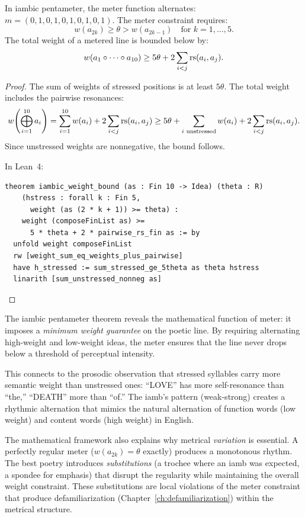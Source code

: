 \begin{theorem}
\label{thm:iambic}
In iambic pentameter, the meter function alternates:
$m = (0, 1, 0, 1, 0, 1, 0, 1, 0, 1)$.  The meter constraint requires:
\[
  w(a_{2k}) \geq \theta > w(a_{2k-1})
  \quad \text{for } k = 1, \ldots, 5.
\]
The total weight of a metered line is bounded below by:
\[
  w(a_1 \circ \cdots \circ a_{10}) \geq 5\theta
  + 2\sum_{i < j} \mathrm{rs}(a_i, a_j).
\]
\end{theorem}

\begin{proof}
The sum of weights of stressed positions is at least $5\theta$.  The total
weight includes the pairwise resonances:
\[
  w\!\left(\bigoplus_{i=1}^{10} a_i\right)
  = \sum_{i=1}^{10} w(a_i) + 2\sum_{i < j} \mathrm{rs}(a_i, a_j)
  \geq 5\theta + \sum_{i \text{ unstressed}} w(a_i)
  + 2\sum_{i < j} \mathrm{rs}(a_i, a_j).
\]
Since unstressed weights are nonnegative, the bound follows.

In Lean~4:
\begin{lstlisting}
theorem iambic_weight_bound (as : Fin 10 -> Idea) (theta : R)
    (hstress : forall k : Fin 5,
      weight (as (2 * k + 1)) >= theta) :
    weight (composeFinList as) >=
      5 * theta + 2 * pairwise_rs_fin as := by
  unfold weight composeFinList
  rw [weight_sum_eq_weights_plus_pairwise]
  have h_stressed := sum_stressed_ge_5theta as theta hstress
  linarith [sum_unstressed_nonneg as]
\end{lstlisting}
\end{proof}

\begin{interpretation}
\label{interp:meter}
The iambic pentameter theorem reveals the mathematical function of meter:
it imposes a \emph{minimum weight guarantee} on the poetic line.  By requiring
alternating high-weight and low-weight ideas, the meter ensures that the line
never drops below a threshold of perceptual intensity.

This connects to the prosodic observation that stressed syllables carry more
semantic weight than unstressed ones: ``LOVE'' has more self-resonance than
``the,'' ``DEATH'' more than ``of.''  The iamb's pattern (weak-strong) creates a
rhythmic alternation that mimics the natural alternation of function words
(low weight) and content words (high weight) in English.

The mathematical framework also explains why metrical \emph{variation} is
essential.  A perfectly regular meter ($w(a_{2k}) = \theta$ exactly) produces
a monotonous rhythm.  The best poetry introduces \emph{substitutions} (a
trochee where an iamb was expected, a spondee for emphasis) that disrupt
the regularity while maintaining the overall weight constraint.  These
substitutions are local violations of the meter constraint that produce
defamiliarization (Chapter~\ref{ch:defamiliarization}) within the metrical
structure.
\end{interpretation}


